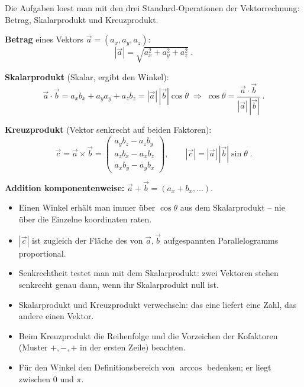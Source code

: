 

Die Aufgaben loest man mit den drei Standard-Operationen der
Vektorrechnung: Betrag, Skalarprodukt und Kreuzprodukt.

\begin{werkzeugkasten}[Werkzeuge]
\textbf{Betrag} eines Vektors $\vec a=(a_x,a_y,a_z)$:
\begin{equation}
  |\vec a|=\sqrt{a_x^2+a_y^2+a_z^2}\;.
\end{equation}

\textbf{Skalarprodukt} (Skalar, ergibt den Winkel):
\begin{equation}
  \vec a\cdot\vec b = a_xb_x+a_ya_y+a_zb_z
  = |\vec a|\,|\vec b|\cos\theta
  \;\Rightarrow\;
  \cos\theta=\frac{\vec a\cdot\vec b}{|\vec a|\,|\vec b|}\;.
\end{equation}

\textbf{Kreuzprodukt} (Vektor senkrecht auf beiden Faktoren):
\begin{equation}
  \vec c=\vec a\times\vec b
  =\begin{pmatrix}
     a_yb_z-a_zb_y\\ a_zb_x-a_xb_z\\ a_xb_y-a_yb_x
   \end{pmatrix},
  \qquad |\vec c|=|\vec a|\,|\vec b|\sin\theta\;.
\end{equation}

\textbf{Addition komponentenweise:} $\vec a+\vec b=(a_x+b_x,\dots)$.
\end{werkzeugkasten}

\begin{werkzeugkasten}[Vorgehen]
\begin{itemize}
  \item Einen Winkel erhält man immer über $\cos\theta$ aus dem
        Skalarprodukt -- nie über die Einzelne koordinaten raten.
  \item $|\vec c|$ ist zugleich der Fläche des von $\vec a,\vec b$
        aufgespannten Parallelogramms proportional.
  \item Senkrechtheit testet man mit dem Skalarprodukt: zwei Vektoren
        stehen senkrecht genau dann, wenn ihr Skalarprodukt null ist.
\end{itemize}
\end{werkzeugkasten}

\begin{achtung}
\begin{itemize}
  \item Skalarprodukt und Kreuzprodukt verwechseln: das eine liefert eine
        Zahl, das andere einen Vektor.
  \item Beim Kreuzprodukt die Reihenfolge und die Vorzeichen der
        Kofaktoren (Muster $+,-,+$ in der ersten Zeile) beachten.
  \item Für den Winkel den Definitionsbereich von $\arccos$ bedenken;
        er liegt zwischen $0$ und $\pi$.
\end{itemize}
\end{achtung}
